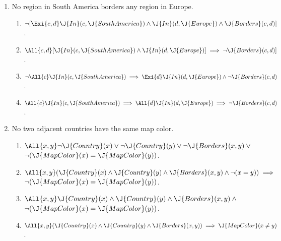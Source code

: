 \begin{uexercise}
\begin{enumerate}
\item No region in South America borders any region in Europe.
\begin{enumerate}
\item \(\lnot [\Exi{c,d}  \J{In}(c,\J{SouthAmerica}) \land \J{In}(d,\J{Europe}) \land \J{Borders}(c,d)]\).
\item \(\All{c,d}  [\J{In}(c,\J{SouthAmerica}) \land \J{In}(d,\J{Europe})] \implies \lnot \J{Borders}(c,d)]\).
\item \(\lnot \All{c}  \J{In}(c,\J{SouthAmerica}) \implies \Exi{d} \J{In}(d,\J{Europe}) \land 
\lnot \J{Borders}(c,d)\).
\item \(\All{c} \J{In}(c,\J{SouthAmerica}) \implies \All{d} \J{In}(d,\J{Europe}) \implies \lnot \J{Borders}(c,d)\). 
\end{enumerate}

\item No two adjacent countries have the same map color.
\begin{enumerate}
  \item \(\All{x,y} \lnot \J{Country}(x) \lor \lnot \J{Country}(y) \lor \lnot \J{Borders}(x,y) \lor {}\)\\
        \tab\tab\(\lnot (\J{MapColor}(x) = \J{MapColor}(y))\).
  \item \(\All{x,y} (\J{Country}(x) \land \J{Country}(y) \land \J{Borders}(x,y) \land \lnot(x=y)) \implies {}\)\\
        \tab\tab\(\lnot (\J{MapColor}(x) = \J{MapColor}(y))\).
  \item \(\All{x,y} \J{Country}(x) \land \J{Country}(y) \land \J{Borders}(x,y) \land {}\)\\
        \tab\tab\(\lnot (\J{MapColor}(x) = \J{MapColor}(y))\).
  \item \(\All{x,y} (\J{Country}(x) \land \J{Country}(y) \land \J{Borders}(x,y) ) \implies \J{MapColor}(x\neq y)\).
\end{enumerate}\end{enumerate}
\end{uexercise} 

